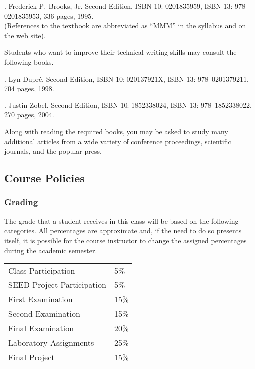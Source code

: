 \documentclass[11pt]{article}
\begin{document}
. Frederick P.\ Brooks, Jr.
Second Edition, ISBN-10: 0201835959, ISBN-13: 978--0201835953, 336 pages, 1995. \\
(References to the textbook are abbreviated as ``MMM'' in the syllabus and on the web site).

\noindent
Students who want to improve their technical writing skills may consult the following books.

. Lyn Dupr\'e. Second Edition,  ISBN-10: 020137921X,
ISBN-13: 978--0201379211, 704 pages, 1998.

. Justin Zobel. Second Edition, ISBN-10: 1852338024, ISBN-13:
978--1852338022, 270 pages, 2004.

\noindent Along with reading the required books, you may be asked to study many additional articles from a wide variety
of conference proceedings, scientific journals, and the popular press.

\subsection*{Course Policies}

\subsubsection*{Grading}

The grade that a student receives in this class will be based on the following categories. All percentages are
approximate and, if the need to do so presents itself, it is possible for the course instructor to change the assigned
percentages during the academic semester.

\begin{center}
  \begin{tabular}{ll}
    Class Participation        & 5\%  \\
    SEED Project Participation & 5\%  \\
    First Examination          & 15\% \\
    Second Examination         & 15\% \\
    Final Examination          & 20\% \\
    Laboratory Assignments     & 25\% \\
    Final Project              & 15\%
  \end{tabular}
\end{center}
\end{document}
